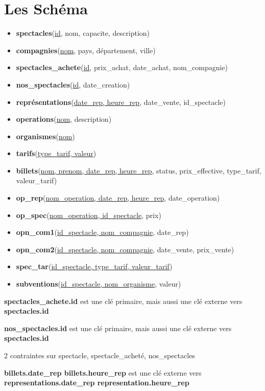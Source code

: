 \documentclass[10pt]{report}
\begin{document}
\section{Les Schéma}
\begin{itemize}
\item \textbf{spectacles}(\underline{id}, nom, capacite, description)
\item \textbf{compagnies}(\underline{nom}, pays, département, ville)
\item \textbf{spectacles\_achete}(\underline{id}, prix\_achat, date\_achat, nom\_compagnie)
\item \textbf{nos\_spectacles}(\underline{id}, date\_creation)
\item \textbf{représentations}(\underline{date\_rep, heure\_rep}, date\_vente, id\_spectacle)
\item \textbf{operations}(\underline{nom}, description)
\item \textbf{organismes}(\underline{nom})
\item \textbf{tarifs}(\underline{type\_tarif, valeur})
\item \textbf{billets}(\underline{nom, prenom, date\_rep, heure\_rep}, status, prix\_effective, type\_tarif, valeur\_tarif)

\item \textbf{op\_rep}(\underline{nom\_operation, date\_rep, heure\_rep}, date\_operation)
\item \textbf{op\_spec}(\underline{nom\_operation, id\_spectacle}, prix)
\item \textbf{opn\_com1}(\underline{id\_spectacle, nom\_compagnie}, date\_rep)
\item \textbf{opn\_com2}(\underline{id\_spectacle, nom\_compagnie}, date\_vente, prix\_vente)
\item \textbf{spec\_tar}(\underline{id\_spectacle, type\_tarif, valeur\_tarif})
\item \textbf{subventions}(\underline{id\_spectacle, nom\_organisme}, valeur)
\end{itemize}

\textbf{spectacles\_achete.id} est une clé primaire, mais aussi une clé externe vers \textbf{spectacles.id}

\textbf{nos\_spectacles.id} est une clé primaire, mais aussi une clé externe vers \textbf{spectacles.id}

2 contraintes  sur spectacle, spectacle\_acheté, nos\_spectacles

\textbf{billets.date\_rep billets.heure\_rep} est une clé externe vers \textbf{representations.date\_rep representation.heure\_rep}
\end{document}
